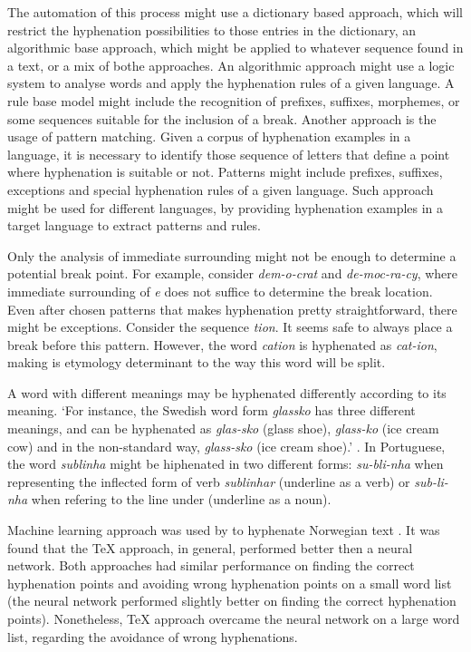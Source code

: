 \documentclass{article}
\begin{document}
The automation of this process might use a dictionary based approach, which
will restrict the hyphenation possibilities to those entries in the dictionary,
an algorithmic base approach, which might be applied to whatever sequence found
in a text, or a mix of bothe approaches. An algorithmic approach might use a
logic system to analyse words and apply the hyphenation rules of a given
language. A rule base model might include the recognition of prefixes,
suffixes, morphemes, or some sequences suitable for the inclusion of a break.
Another approach is the usage of pattern matching. Given a corpus of
hyphenation examples in a language, it is necessary to identify those sequence
of letters that define a point where hyphenation is suitable or not. Patterns
might include prefixes, suffixes, exceptions and special hyphenation rules of a
given language. Such approach might be used for different languages, by
providing hyphenation examples in a target language to extract patterns and
rules.

Only the analysis of immediate surrounding might not be enough to determine a
potential break point. For example, consider \emph{dem-o-crat} and \emph{de-moc-ra-cy},
where immediate surrounding of \emph{e} does not suffice to determine the break
location. Even after chosen patterns that makes hyphenation pretty
straightforward, there might be exceptions. Consider the sequence \emph{tion}. It
seems safe to always place a break before this pattern. However, the word
\emph{cation} is hyphenated as \emph{cat-ion}, making is etymology determinant to the way
this word will be split. 

A word with different meanings may be hyphenated differently according to its
meaning. `For instance, the Swedish word form \emph{glassko} has three different
meanings, and can be hyphenated as \emph{glas-sko} (glass shoe),
\emph{glass-ko} (ice cream cow) and in the non-standard way,
\emph{glass-sko} (ice cream shoe).' \cite{nemeth2006}. In Portuguese, the
word \emph{sublinha} might be hiphenated in two different forms:
\emph{su-bli-nha} when representing the inflected form of verb
\emph{sublinhar} (underline as a verb) or \emph{sub-li-nha} when refering
to the line under (underline as a noun).


Machine learning approach was used by to hyphenate Norwegian text
\cite{kristensen2001}. It was found that the \TeX{} approach, in general,
performed better then a neural network. Both approaches had similar
performance on finding the correct hyphenation points and avoiding wrong
hyphenation points on a small word list (the neural network performed slightly
better on finding the correct hyphenation points). Nonetheless, \TeX{} approach overcame
the neural network on a large word list, regarding the avoidance of wrong
hyphenations.
\end{document}
